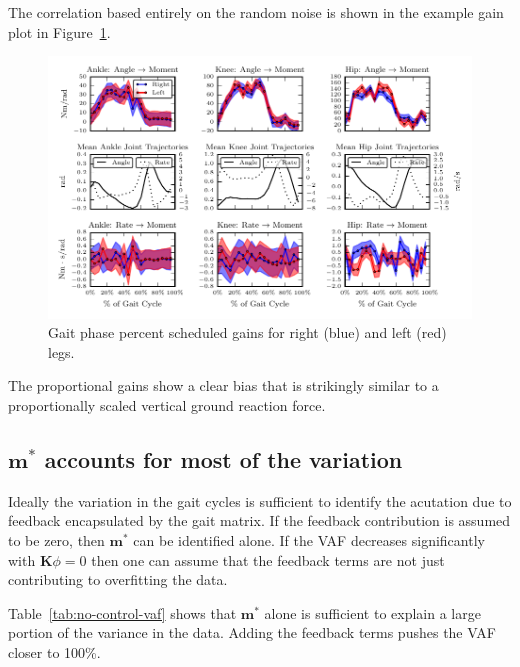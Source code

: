 \documentclass{article}
\begin{document}
The correlation based entirely on the random noise is shown in the example gain
plot in Figure~\ref{fig:inverse-dynamics=correlation-gains}.
%
\begin{figure}
  \begin{center}
    \includegraphics{figures/example-inverse-dynamics-correlation-gains.pdf}
    \caption{Gait phase percent scheduled gains for right (blue) and left (red) legs.}
    \label{fig:inverse-dynamics=correlation-gains}
  \end{center}
\end{figure}

The proportional gains show a clear bias that is strikingly similar to a
proportionally scaled vertical ground reaction force.

\subsection*{$\mathbf{m}^*$ accounts for most of the variation}
%
Ideally the variation in the gait cycles is sufficient to identify the
acutation due to feedback encapsulated by the gait matrix. If the feedback
contribution is assumed to be zero, then $\mathbf{m}^*$ can be identified
alone. If the VAF decreases significantly with $\mathbf{K}{\phi}=0$ then one
can assume that the feedback terms are not just contributing to overfitting the
data.
%
\begin{table}
  \cprotect\caption{Generated by \verb|src/table_no_control_vaf_comparison.py|.}
  \centering
  
  \label{tab:no-control-vaf}
\end{table}

Table~\ref{tab:no-control-vaf} shows that $\mathbf{m}^*$ alone is sufficient to
explain a large portion of the variance in the data. Adding the feedback terms
pushes the VAF closer to 100\%.
\end{document}
